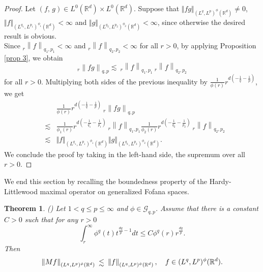 \documentclass[a4paper,12pt,intlimits,oneside]{amsart}
\numberwithin{equation}{section}
\newtheorem{theorem}{Theorem}[section]
\numberwithin{equation}{section}
\def\lsim{\raisebox{-1ex}{$~\stackrel{\textstyle <}{\sim}~$}}
\theoremstyle{definition}
\begin{document}
\begin{proof}
Let $(f,\,g) \in L^{0} (\mathbb{R}^{d})\times L^{0} (\mathbb{R}^{d})$. Suppose that $\Vert f g\Vert_{(L^{q},L^{p})^{\phi}(\mathbb{R}^{d})} \neq 0$, $\Vert f \Vert_{(L^{q_{1}},L^{p_{1}})^{\phi_{1}}(\mathbb{R}^{d}) } < \infty$ and  $ \Vert g \Vert_{(L^{q_{2}},L^{p_{2}})^{\phi_{2}}(\mathbb{R}^{d})}< \infty$, since otherwise the desired result is obvious.\\ Since $_{r}\left\|f\right\|_{q_{1},p_{1}}<\infty$ and $_{r}\left\|f\right\|_{q_{2},p_{2}}< \infty$ for all $r>0$, by applying Proposition \ref{prop 3}, we obtain 
\begin{equation*}
    _{r}\left\|fg\right\|_{q,p} \lesssim \: _{r}\left\|f\right\|_{q_{1},p_{1}} \: _{r}\left\|f\right\|_{q_{2},p_{2}}
\end{equation*}
for all $r>0$. Multiplying both sides of the previous inequality by
$\frac{1}{\phi(r)}r^{d(-\frac{1}{q}-\frac{1}{p})}$, we get 
\begin{eqnarray*}
&&\frac{1}{\phi(r)}r^{d(-\frac{1}{q}-\frac{1}{p})}\: _{r}\left\|fg\right\|_{q,p} \\ & \lesssim &  \frac{1}{\phi_{1}(r)}r^{d(-\frac{1}{q_{1}}-\frac{1}{p_{1}})}\:_{r}\left\|f\right\|_{q_{1},p_{1}} \frac{1}{\phi_{2}(r)}r^{d(-\frac{1}{q_{2}}-\frac{1}{p_{2}})}\: _{r}\left\|f\right\|_{q_{2},p_{2}}\\
& \lesssim & \Vert f \Vert_{(L^{q_{1}},L^{p_{1}})^{\phi_{1}}(\mathbb{R}^{d}) } \Vert g \Vert_{(L^{q_{2}},L^{p_{2}})^{\phi_{2}}(\mathbb{R}^{d})}.
\end{eqnarray*}
We conclude the proof by taking in the left-hand side, the supremum  over all $r>0$.
\end{proof}
We end this section by recalling the boundedness property of the Hardy-Littlewood maximal operator on generalized Fofana spaces.
\begin{theorem}(\cite[Theorem 3.1]{NKD})
\label{theo 1}
 Let $1 < q\leq p \leq \infty$ and $\phi\in \mathcal{G}_{q,p}$. Assume that there is a constant $ C > 0 $ such that for any $ r >0 $  
  \begin{equation}\label{eqq 2}
 \displaystyle\int_{r}^{\infty} \phi^{q}(t)t^{\frac{dq}{p}-1} dt \leq C   \phi^{q}(r)r^{\frac{dq}{p}}.
  \end{equation}
  Then $$\left\Vert Mf \right\Vert_{(L^{q},L^{p})^{\phi}(\mathbb{R}^{d})} \lsim  \left\Vert f  \right\Vert_{(L^{q},L^{p})^{\phi}(\mathbb{R}^{d})}, \quad f \in (L^{q},L^{p})^{\phi}(\mathbb{R}^{d}).$$
\end{theorem}
\end{document}
